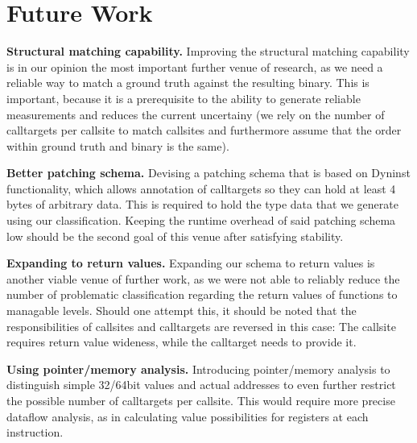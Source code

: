 \section{Future Work}
\label{chapter:Future_Work}
\textbf{Structural matching capability.} 
Improving the structural matching capability is in our opinion the most 
important further venue of research, as we need a reliable way to 
match a ground truth against the resulting binary. This is important, 
because it is a prerequisite to the ability to generate reliable 
measurements and reduces the current uncertainy (we rely on the 
number of calltargets per callsite to match callsites and furthermore
assume that the order within ground truth and binary is the same).

\textbf{Better patching schema.} 
Devising a patching schema
that is based on Dyninst functionality, 
which allows annotation of calltargets so they can hold at least 
4 bytes of arbitrary data. This is required to hold the type data that
we generate using our classification. Keeping the runtime overhead
of said patching schema low should be the second goal of this venue 
after satisfying stability.

\textbf{Expanding to return values.} 
Expanding our schema to return values
is another viable venue of further work, as we were not able to 
reliably reduce the number of problematic classification regarding 
the return values of functions to 
managable levels. Should one attempt this, it should be noted that the
responsibilities of callsites and calltargets are reversed in this 
case: The callsite requires return value wideness, while the calltarget
needs to provide it.

\textbf{Using pointer/memory analysis.} 
Introducing pointer/memory analysis
to distinguish simple 32/64bit values and actual addresses to even further restrict the 
possible number of calltargets per callsite. This would require more 
precise dataflow analysis, as in calculating value possibilities for 
registers at each instruction.
